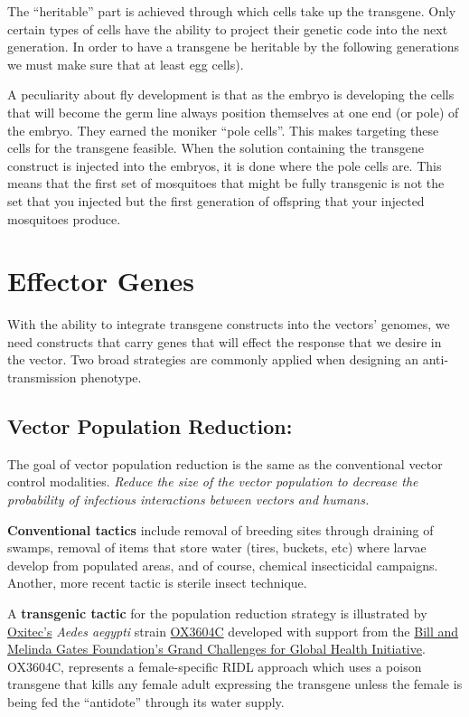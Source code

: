 The ``heritable'' part is achieved through which cells take up the transgene.
Only certain types of cells have the ability to project their genetic code into the next generation.
In order to have a transgene be heritable by the following generations we must make sure that at least egg cells).

A peculiarity about fly development is that as the embryo is developing the cells that will become the germ line always position themselves at one end (or pole) of the embryo.
They earned the moniker ``pole cells''.
This makes targeting these cells for the transgene feasible.
When the solution containing the transgene construct is injected into the embryos, it is done where the pole cells are.
This means that the first set of mosquitoes that might be fully transgenic is not the set that you injected but the first generation of offspring that your injected mosquitoes produce.

\section{Effector Genes}

With the ability to integrate transgene constructs into the vectors' genomes, we need constructs that carry genes that will effect the response that we desire in the vector.
Two broad strategies are commonly applied when designing an anti-transmission phenotype.

\subsection{Vector Population Reduction:}

The goal of vector population reduction is the same as the conventional vector control modalities.
\emph{Reduce the size of the vector population to decrease the probability of infectious interactions between vectors and humans.}

\textbf{Conventional tactics} include removal of breeding sites through draining of swamps, removal of items that store water (tires, buckets, etc) where larvae develop from populated areas, and of course, chemical insecticidal campaigns.
Another, more recent tactic is sterile insect technique.

A \textbf{transgenic tactic} for the population reduction strategy is illustrated by \href{http://www.oxitec.com/}{Oxitec's} \emph{Aedes aegypti} strain \href{http://www.oxitec.com/health/our-products/aedes-agypti-ox3604c/}{OX3604C} developed with support from the \href{http://www.grandchallenges.org/Pages/Default.aspx}{Bill and Melinda Gates Foundation's Grand Challenges for Global Health Initiative}.
OX3604C, represents a female-specific \gls{RIDL} approach which uses a poison transgene that kills any female adult expressing the transgene unless the female is being fed the ``antidote'' through its water supply.

